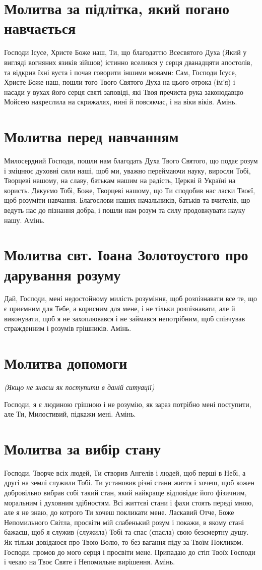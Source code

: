 \documentclass[chapters.tex]{subfiles}
\begin{document}
\section{Молитва за підлітка, який погано навчається}
Господи Ісусе, Христе Боже наш, Ти, що благодаттю Всесвятого Духа (Який у вигляді вогняних язиків зійшов) істинно вселився у серця дванадцяти апостолів, та відкрив їхні вуста і почав говорити іншими мовами: Сам, Господи Ісусе, Христе Боже наш, пошли того Твого Святого Духа на цього отрока (ім’я) і насади у вухах його серця святі заповіді, які Твоя пречиста рука законодавцю Мойсею накреслила на скрижалях, нині й повсякчас, і на віки віків. Амінь.

\section{Молитва перед навчанням}
Милосердний Господи, пошли нам благодать Духа Твого Святого, що подає розум і зміцнює духовні сили наші, щоб ми, уважно переймаючи науку, виросли Тобі, Творцеві нашому, на славу, батькам нашим на радість, Церкві й Україні на користь. Дякуємо Тобі, Боже, Творцеві нашому, що Ти сподобив нас ласки Твоєї, щоб розуміти навчання. Благослови наших начальників, батьків та вчителів, що ведуть нас до пізнання добра, і пошли нам розум та силу продовжувати науку нашу. Амінь.

\section{Молитва свт. Іоана Золотоустого про дарування розуму}
Дай, Господи, мені недостойному милість розуміння, щоб розпізнавати все те, що є приємним для Тебе, а корисним для мене, і не тільки розпізнавати, але й виконувати, щоб я не захоплювався і не займався непотрібним, щоб співчував стражденним і розумів грішників. Амінь.

\section{Молитва допомоги}
\emph{(Якщо не знаєш як поступити в даній ситуації)}

Господи, я є людиною грішною і не розумію, як зараз потрібно мені поступити, але Ти, Милостивий, підкажи мені. Амінь.

\section{Молитва за вибір стану}
Господи, Творче всіх людей, Ти створив Ангелів і людей, щоб перші в Небі, а другі на землі служили Тобі. Ти установив різні стани життя і хочеш, щоб кожен добровільно вибрав собі такий стан, який найкраще відповідає його фізичним, моральним і духовним здібностям. Всі життєві стани і фахи стоять переді мною, але я не знаю, до котрого Ти хочеш покликати мене. Ласкавий Отче, Боже Непомильного Світла, просвіти мій слабенький розум і покажи, в якому стані бажаєш, щоб я служив (служила) Тобі та спас (спасла) свою безсмертну душу. Як тільки довідаюся про Твою Волю, то без вагання піду за Твоїм Покликом. Господи, промов до мого серця і просвіти мене. Припадаю до стіп Твоїх Господи і чекаю на Твоє Святе і Непомильне вирішення. Амінь.
\end{document}
